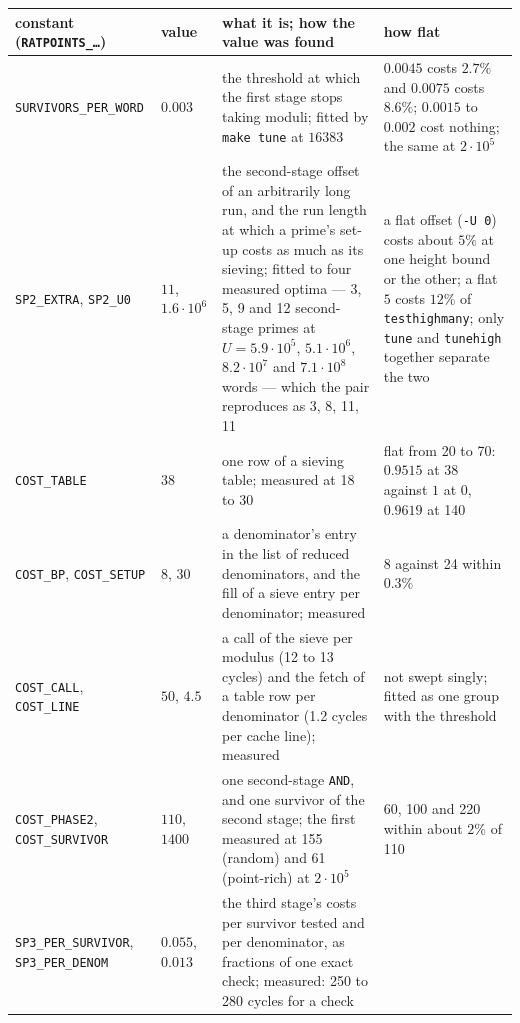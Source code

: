 \documentclass[12pt,a4paper,oneside]{amsart}
\begin{document}
\begin{table}[tbp]\footnotesize\setlength{\tabcolsep}{3pt}%
\renewcommand{\arraystretch}{1.1}
\begin{tabular}{@{}P{4.0cm}P{1.7cm}P{5.6cm}P{5.6cm}@{}}
constant (\texttt{RATPOINTS\_\dots}) & value & what it is; how the value was found & how flat \\
\hline
\texttt{SURVIVORS\_PER\_WORD} & $0.003$ &
  the threshold at which the first stage stops taking moduli; fitted by
  \texttt{make tune} at $16383$ &
  $0.0045$ costs $2.7\%$ and $0.0075$ costs $8.6\%$; $0.0015$ to $0.002$
  cost nothing; the same at $2\cdot10^5$ \\[3pt]
\texttt{SP2\_EXTRA}, \texttt{SP2\_U0} & $11$, $1.6\cdot10^6$ &
  the second-stage offset of an arbitrarily long run, and the run length at
  which a prime's set-up costs as much as its sieving; fitted to four
  measured optima --- 3, 5, 9 and 12 second-stage primes at $U =
  5.9\cdot10^5$, $5.1\cdot10^6$, $8.2\cdot10^7$ and $7.1\cdot10^8$ words ---
  which the pair reproduces as 3, 8, 11, 11 &
  a flat offset (\verb+-U 0+) costs about $5\%$ at one height bound or the
  other; a flat~$5$ costs $12\%$ of \texttt{testhighmany}; only
  \texttt{tune} and \texttt{tunehigh} together separate the two \\[3pt]
\texttt{COST\_TABLE} & $38$ &
  one row of a sieving table; measured at 18 to 30 &
  flat from 20 to 70: $0.9515$ at 38 against $1$ at 0, $0.9619$ at 140 \\[3pt]
\texttt{COST\_BP}, \texttt{COST\_SETUP} & $8$, $30$ &
  a denominator's entry in the list of reduced denominators, and the fill
  of a sieve entry per denominator; measured &
  8 against 24 within $0.3\%$ \\[3pt]
\texttt{COST\_CALL}, \texttt{COST\_LINE} & $50$, $4.5$ &
  a call of the sieve per modulus (12 to 13 cycles) and the fetch of a table
  row per denominator (1.2 cycles per cache line); measured &
  not swept singly; fitted as one group with the threshold \\[3pt]
\texttt{COST\_PHASE2}, \texttt{COST\_SURVIVOR} & $110$, $1400$ &
  one second-stage \texttt{AND}, and one survivor of the second stage; the
  first measured at 155 (random) and 61 (point-rich) at $2\cdot10^5$ &
  60, 100 and 220 within about $2\%$ of 110 \\[3pt]
\texttt{SP3\_PER\_SURVIVOR}, \texttt{SP3\_PER\_DENOM} & $0.055$, $0.013$ &
  the third stage's costs per survivor tested and per denominator, as
  fractions of one exact check; measured: 250 to 280 cycles for a check

\end{tabular}
\end{table}
\end{document}
